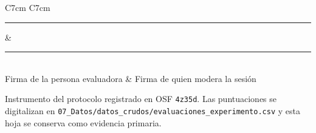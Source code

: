 \documentclass[11pt,a4paper]{article}
\begin{document}
\vspace{18pt}

\begin{center}
\begin{tabular}{C{7cm} C{7cm}}
\rule{6.5cm}{0.4pt} & \rule{6.5cm}{0.4pt} \\
{\footnotesize Firma de la persona evaluadora} &
{\footnotesize Firma de quien modera la sesión} \\
\end{tabular}
\end{center}

\vfill
{\footnotesize
Instrumento del protocolo registrado en OSF \texttt{4z35d}. Las puntuaciones se
digitalizan en \texttt{07\_Datos/datos\_crudos/evaluaciones\_experimento.csv} y
esta hoja se conserva como evidencia primaria.}
\end{document}
